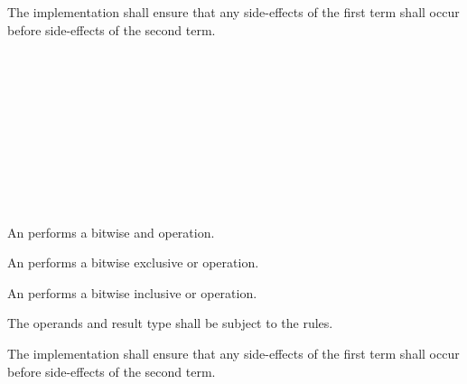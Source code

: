 
\specsubsubitem
The implementation shall ensure that any side-effects of the first term shall
occur before side-effects of the second term.


\begin{grammar}
 \\
	 \\
	 \terminal{\&}  \\

 \\
	 \\
	 \terminal{\^}  \\

 \\
	 \\
	 \terminal{|}  \\
\end{grammar}

\specsubsubitem
An  performs a bitwise and operation.

\specsubsubitem
An  performs a bitwise exclusive or
operation.

\specsubsubitem
An  performs a bitwise inclusive or
operation.

\specsubsubitem
The operands and result type shall be subject to the 
rules.

\specsubsubitem
The implementation shall ensure that any side-effects of the first term shall
occur before side-effects of the second term.


